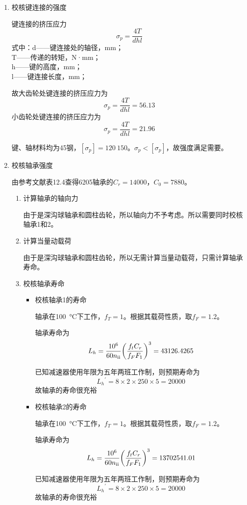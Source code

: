 \begin{enumerate}[A]
	\item 校核键连接的强度
	\par 键连接的挤压应力\\$$\sigma_p=\dfrac{4T}{dhl}$$
	式中：d——键连接处的轴径，mm；\\
	T——传递的转矩，N·mm；\\
	h——键的高度，mm；\\
	l——键连接长度，mm；
	\par 故大齿轮处键连接的挤压应力为$$\sigma_p=\dfrac{4T}{dhl}=56.13$$小齿轮处键连接的挤压应力为$$\sigma_p=\dfrac{4T}{dhl}=21.96$$
	\par 键、轴材料均为45钢，$\left[\sigma_p\right]= 120~150$。$\sigma_p<\left[\sigma_p\right]$，故强度满足需要。
	\item 校核轴承强度
	\par 由参考文献\cite{1}表12.4查得6205轴承的$C_r=14000$，$C_0=7880$。
	\begin{enumerate}[a]
		\item 计算轴承的轴向力
		\par 由于是深沟球轴承和圆柱齿轮，所以轴向力不予考虑。所以需要同时校核轴承1和2。
		\item 计算当量动载荷
		\par 由于是深沟球轴承和圆柱齿轮，所以无需计算当量动载荷，只需计算轴承寿命。
		\item 校核轴承寿命
		\begin{itemize}
			\item 校核轴承1的寿命
			\par 轴承在\SI{100}{\degreeCelsius}下工作，$f_T=1$。根据其载荷性质，取$f_F=1.2$。
			\par 轴承寿命为
			$$L_h=\dfrac{10^6}{60n_{\mathrm{\uppercase\expandafter{\romannumeral2}}}}{\left(\dfrac{f_tC_r}{f_FF_1}\right)}^3=43126.4265$$
			\par 已知减速器使用年限为五年两班工作制，则预期寿命为
			$${L_h}^{\prime}=8\times 2\times 250\times 5=20000$$
			故轴承的寿命很充裕
			\item 校核轴承2的寿命
			\par 轴承在\SI{100}{\degreeCelsius}下工作，$f_T=1$。根据其载荷性质，取$f_F=1.2$。
			\par 轴承寿命为
			$$L_h=\dfrac{10^6}{60n_{\mathrm{\uppercase\expandafter{\romannumeral2}}}}{\left(\dfrac{f_tC_r}{f_FF_1}\right)}^3=13702541.01$$
			\par 已知减速器使用年限为五年两班工作制，则预期寿命为
			$${L_h}^{\prime}=8\times 2\times 250\times 5=20000$$
			故轴承的寿命很充裕
		\end{itemize}
	\end{enumerate}
\end{enumerate}

